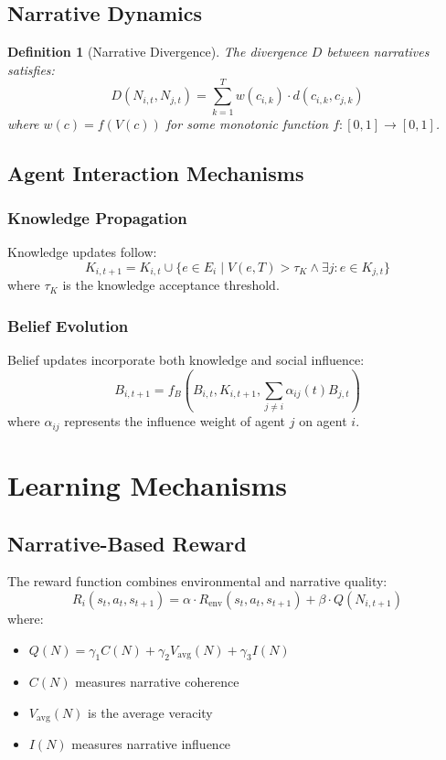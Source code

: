 \documentclass{article}
\newtheorem{definition}{Definition}
\begin{document}
\subsection{Narrative Dynamics}

\begin{definition}[Narrative Divergence]
The divergence $D$ between narratives satisfies:
\begin{equation}
    D(N_{i,t}, N_{j,t}) = \sum_{k=1}^T w(c_{i,k}) \cdot d(c_{i,k}, c_{j,k})
\end{equation}
where $w(c) = f(V(c))$ for some monotonic function $f:[0,1] \rightarrow [0,1]$.
\end{definition}

\subsection{Agent Interaction Mechanisms}

\subsubsection{Knowledge Propagation}
Knowledge updates follow:
\begin{equation}
    K_{i,t+1} = K_{i,t} \cup \{e \in E_i \mid V(e, T) > \tau_K \land \exists j: e \in K_{j,t}\}
\end{equation}
where $\tau_K$ is the knowledge acceptance threshold.

\subsubsection{Belief Evolution}
Belief updates incorporate both knowledge and social influence:
\begin{equation}
    B_{i,t+1} = f_B(B_{i,t}, K_{i,t+1}, \sum_{j \neq i} \alpha_{ij}(t)B_{j,t})
\end{equation}
where $\alpha_{ij}$ represents the influence weight of agent $j$ on agent $i$.

\section{Learning Mechanisms}

\subsection{Narrative-Based Reward}
The reward function combines environmental and narrative quality:
\begin{equation}
    R_i(s_t, a_t, s_{t+1}) = \alpha \cdot R_{\text{env}}(s_t, a_t, s_{t+1}) + \beta \cdot Q(N_{i,t+1})
\end{equation}
where:
\begin{itemize}
    \item $Q(N) = \gamma_1 C(N) + \gamma_2 V_{\text{avg}}(N) + \gamma_3 I(N)$
    \item $C(N)$ measures narrative coherence
    \item $V_{\text{avg}}(N)$ is the average veracity
    \item $I(N)$ measures narrative influence
\end{itemize}
\end{document}
